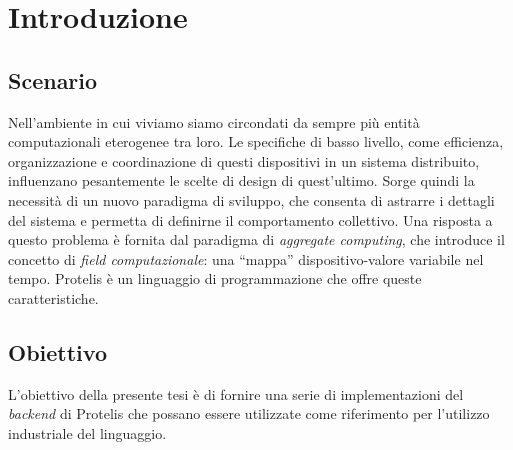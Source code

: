 \section{Introduzione}
\subsection{Scenario}

Nell'ambiente in cui viviamo siamo circondati da sempre più entità computazionali eterogenee tra loro. Le specifiche di basso livello, come efficienza, organizzazione e coordinazione di questi dispositivi in un sistema distribuito, influenzano pesantemente le scelte di design di quest'ultimo. Sorge quindi la necessità di un nuovo paradigma di sviluppo, che consenta di astrarre i dettagli del sistema e permetta di definirne il comportamento collettivo. Una risposta a questo problema è fornita dal paradigma di \textit{aggregate computing}, che introduce il concetto di \textit{field computazionale}: una ``mappa'' dispositivo-valore variabile nel tempo. Protelis è un linguaggio di programmazione che offre queste caratteristiche.


\subsection{Obiettivo}

L'obiettivo della presente tesi è di fornire una serie di implementazioni del \textit{backend} di Protelis che possano essere utilizzate come riferimento per l'utilizzo industriale del linguaggio.
